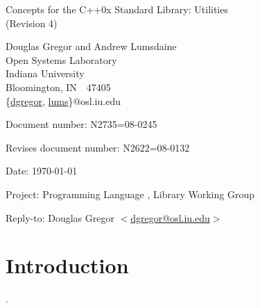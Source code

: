 \documentclass[american,twoside]{book}
\begin{document}
\raggedbottom

\begin{titlepage}
\begin{center}
\huge
Concepts for the C++0x Standard Library: Utilities\\
(Revision 4)

\vspace{0.5in}

\normalsize
Douglas Gregor and Andrew Lumsdaine \\
Open Systems Laboratory \\
Indiana University \\
Bloomington, IN\ \  47405 \\
\{\href{mailto:dgregor@osl.iu.edu}{dgregor}, \href{mailto:lums@osl.iu.edu}{lums}\}@osl.iu.edu
\end{center}

\vspace{1in}
\par\noindent Document number: N2735=08-0245\vspace{-6pt}
\par\noindent Revises document number: N2622=08-0132\vspace{-6pt}
\par\noindent Date: \today\vspace{-6pt}
\par\noindent Project: Programming Language \Cpp{}, Library Working Group\vspace{-6pt}
\par\noindent Reply-to: Douglas Gregor $<$\href{mailto:dgregor@osl.iu.edu}{dgregor@osl.iu.edu}$>$\vspace{-6pt}

\section*{Introduction}
.


\end{titlepage}
\end{document}
